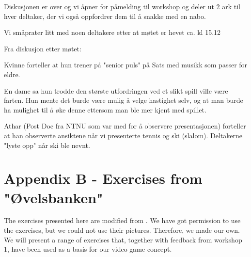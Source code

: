 Diskusjonen er over og vi åpner for påmelding til workshop og deler ut 2 ark til hver deltaker, der vi også oppfordrer dem til å snakke med en nabo.

Vi småprater litt med noen deltakere etter at møtet er hevet ca. kl 15.12

Fra diskusjon etter møtet: 

Kvinne forteller at hun trener på "senior puls" på Sats med musikk som passer for eldre.

En dame sa hun trodde den største utfordringen ved et slikt spill ville være farten. Hun mente det burde være mulig å velge hastighet selv, og at man burde ha mulighet til å øke denne ettersom man ble mer kjent med spillet.

Athar (Post Doc fra NTNU som var med for å observere presentasjonen) forteller at han observerte ansiktene når vi presenterte 
tennis og ski (slalom). Deltakerne "lyste opp" når ski ble nevnt.

\newpage
\section*{Appendix B - Exercises from "{Ø}velsbanken"}
\label{A}

The exercises presented here are modified from \cite{eldretrening}. We have got permission to use the exercises, but we could not use their pictures. Therefore, we made our own. We will present a range of exercises that, together with feedback from workshop 1, have been used as a basis for our video game concept.

